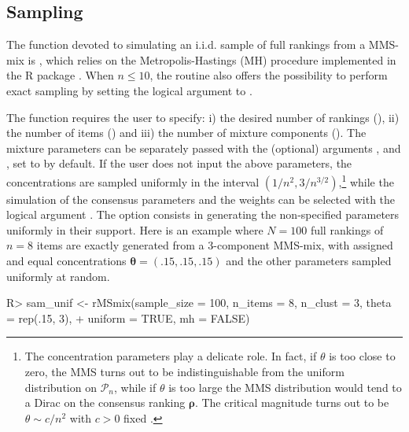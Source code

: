 \subsection{Sampling}
\label{subsec:sampling}
The function devoted to simulating an i.i.d. sample of full rankings from a MMS-mix is , which relies on the Metropolis-Hastings (MH) procedure implemented in the \textsf{R} package  \citep{BayesMallows}. When $n\leq 10$, the routine also offers the possibility to perform exact sampling by setting the logical  argument to .


The  function requires the user to specify: i) the desired number of rankings (), ii) the number of items () and iii) the number of mixture components (). The mixture parameters can be separately passed with the (optional) arguments ,  and , set to  by default. If the user does not input the above parameters, the concentrations are sampled uniformly in the interval $(1/n^2,3/n^{3/2})$,\footnote{The concentration parameters play a delicate role. In fact, if $\theta$ is too close to zero, the MMS turns out to be indistinguishable from the uniform distribution on $\mathcal{P}_n$, while if $\theta$  is too large the MMS distribution would tend to a Dirac on the consensus ranking $\bm\rho$. The critical magnitude turns out to be $\theta\sim c/n^2$ with $c > 0$ fixed \citep{zhong2021mallows}.} while the simulation of the consensus parameters and the weights can be selected with the logical argument . The option  consists in generating the non-specified parameters uniformly in their support. Here is an example where $N=100$ full rankings of $n=8$ items are exactly generated from a 3-component MMS-mix, with assigned and equal concentrations $\bm\theta=(.15,.15,.15)$ and the other parameters sampled uniformly at random. 
\begin{example}
R> sam_unif <- rMSmix(sample_size = 100, n_items = 8, n_clust = 3, theta = rep(.15, 3),
+               uniform = TRUE, mh = FALSE)
\end{example} 

